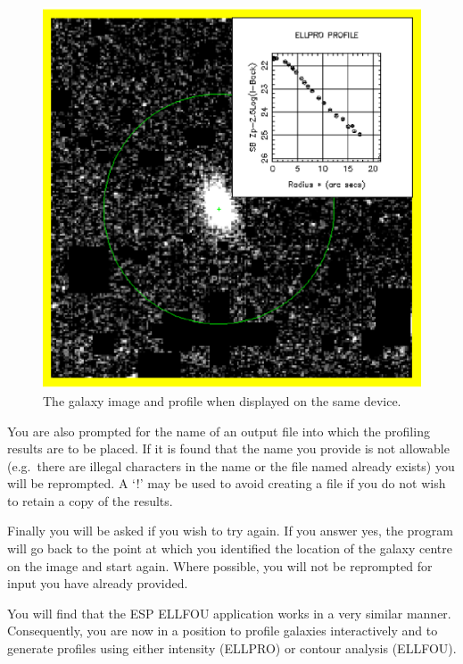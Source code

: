 \documentclass[twoside,11pt]{article}
\begin{document}
\begin{htmlonly}
\begin{figure}[htlb]
\centering 
\includegraphics{sun180_diag3.eps}
\caption{The galaxy image and profile when displayed on the same device.}
\end{figure}
\end{htmlonly}

You are also prompted for the name of an output file into which the 
profiling results are to be placed. If it is found that the name you provide is
not allowable (e.g.\ there are illegal characters in the name or the file named
already exists) you will be reprompted. A `!' may be used to avoid creating a
file if you do not wish to retain a copy of the results.

Finally you will be asked if you wish to try again. If you answer yes, the
program will go back to the point at which you identified the location of the
galaxy centre on the image and start again. Where possible, you will not be
reprompted for input you have already provided.

You will find that the ESP ELLFOU application works in a very similar manner.
Consequently, you are now in a position to profile galaxies
interactively and to generate profiles using either intensity (ELLPRO) or 
contour analysis (ELLFOU).
\end{document}
